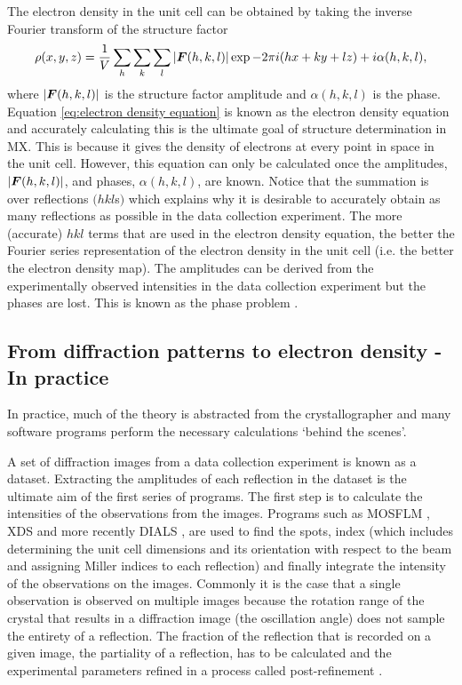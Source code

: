         The electron density in the unit cell can be obtained by taking the inverse Fourier transform of the structure factor
        \begin{equation}
            \rho(x,y,z) = \frac{1}{V} \sum_h \sum_k \sum_l |\boldsymbol{F}(h,k,l)| \exp{-2\pi i (hx + ky + lz) + i \alpha(h,k,l)},
            \label{eq:electron density equation}
        \end{equation}
        where $|\boldsymbol{F}(h,k,l)|$ is the structure factor amplitude and $\alpha(h,k,l)$ is the phase. Equation \ref{eq:electron density equation} is known as the electron density equation and accurately calculating this is the ultimate goal of structure determination in MX.
        This is because it gives the density of electrons at every point in space in the unit cell.
        However, this equation can only be calculated once the amplitudes, $|\boldsymbol{F}(h,k,l)|$, and phases, $\alpha(h,k,l)$, are known.
        Notice that the summation is over reflections $(hkl$s$)$ which explains why it is desirable to accurately obtain as many reflections as possible in the data collection experiment.
        The more (accurate) $hkl$ terms that are used in the electron density equation, the better the Fourier series representation of the electron density in the unit cell (i.e. the better the electron density map).
        The amplitudes can be derived from the experimentally observed intensities in the data collection experiment but the phases are lost. This is known as the phase problem \cite{taylor2010}.

    \subsection{From diffraction patterns to electron density - In practice}
    \label{sub:From diffraction patterns to electron density - In practice}
        In practice, much of the theory is abstracted from the crystallographer and many software programs perform the necessary calculations `behind the scenes'.

        A set of diffraction images from a data collection experiment is known as a dataset.
        Extracting the amplitudes of each reflection in the dataset is the ultimate aim of the first series of programs.
        The first step is to calculate the intensities of the observations from the images.
        Programs such as MOSFLM \cite{leslie2007}, XDS \cite{kabsch2010} and more recently DIALS \cite{waterman2013dials,waterman2016diffraction}, are used to find the spots, index (which includes determining the unit cell dimensions and its orientation with respect to the beam and assigning Miller indices to each reflection) and finally integrate the intensity of the observations on the images.
        Commonly it is the case that a single observation is observed on multiple images because the rotation range of the crystal that results in a diffraction image (the oscillation angle) does not sample the entirety of a reflection.
        The fraction of the reflection that is recorded on a given image, the partiality of a reflection, has to be calculated and the experimental parameters refined in a process called post-refinement \cite{rossmann1979processing, rossmann1979oscillation}.

